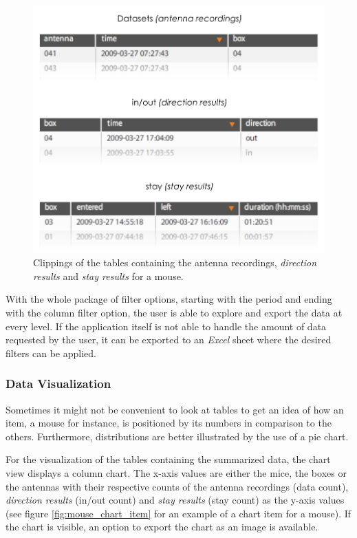 \begin{figure}[htpb]
\begin{center}
  \includegraphics[width=.75\textwidth]{assets/pdf/overview_data.pdf}
  \caption[Overview of the data sets for mouse]{Clippings of the tables containing the antenna recordings, \textit{direction results} and \textit{stay results} for a mouse.}
  \label{fig:overview_data}
\end{center}
\end{figure}  

With the whole package of filter options, starting with the period and ending with the column filter option, the user is able to explore and export the data at every level. If the application itself is not able to handle the amount of data requested by the user, it can be exported to an \textit{Excel} sheet where the desired filters can be applied.       

\subsubsection{Data Visualization}
\label{subsubsec:datavis}

Sometimes it might not be convenient to look at tables to get an idea of how an item, a mouse for instance, is positioned by its numbers in comparison to the others. Furthermore, distributions are better illustrated by the use of a pie chart. 

For the visualization of the tables containing the summarized data, the chart view displays a column chart. The x-axis values are either the mice, the boxes or the antennas with their respective counts of the antenna recordings (data count), \textit{direction results} (in/out count) and \textit{stay results} (stay count) as the y-axis values (see figure \ref{fig:mouse_chart_item} for an example of a chart item for a mouse). If the chart is visible, an option to export the chart as an image is available.

